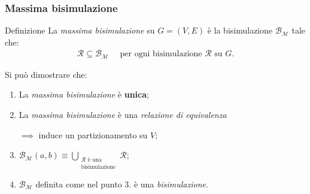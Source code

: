 \documentclass{beamer}
\begin{document}
\begin{frame}\frametitle{Massima bisimulazione}
    \begin{block}{Definizione}
        La \emph{massima bisimulazione} su $G = (V,E)$ è la bisimulazione $\mathcal{B}_\mathcal{M}$ tale che:
        \begin{gather*}
            \mathcal{R} \subseteq \mathcal{B}_\mathcal{M} \quad \text{ per ogni bisimulazione } \mathcal{R} \text{ su } G.
        \end{gather*}
    \end{block}

    \bigskip\bigskip

    Si può dimostrare che:
    \begin{enumerate}
        \item La \emph{massima bisimulazione} è \textbf{unica};
        \item La \emph{massima bisimulazione} è una \emph{relazione di equivalenza}

        $\implies$ induce un partizionamento su $V$;
        \item $\displaystyle \mathcal{B}_\mathcal{M}(a,b) \equiv \bigcup_{\substack{\mathcal{R} \text{ è una}\\\text{bisimulazione}}} \mathcal{R}$;
        \item $\mathcal{B}_\mathcal{M}$ definita come nel punto 3. è una \emph{bisimulazione}.
    \end{enumerate}
\end{frame}
\end{document}
